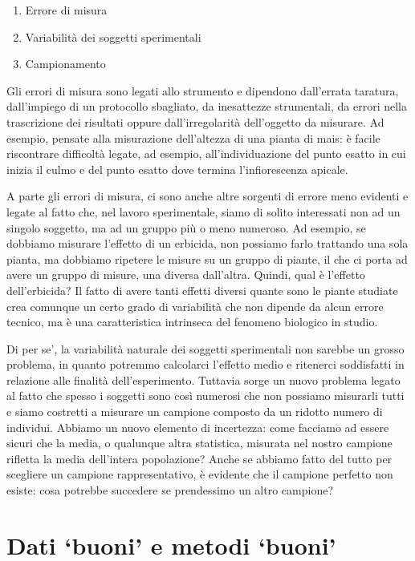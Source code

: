 \documentclass[a4paper,12pt,oneside]{book}
\providecommand{\tightlist}{%
  \setlength{\itemsep}{0pt}\setlength{\parskip}{0pt}}
\begin{document}
\begin{enumerate}
\def\labelenumi{\arabic{enumi}.}
\tightlist
\item
  Errore di misura
\item
  Variabilità dei soggetti sperimentali
\item
  Campionamento
\end{enumerate}

Gli errori di misura sono legati allo strumento e dipendono dall'errata taratura, dall'impiego di un protocollo sbagliato, da inesattezze strumentali, da errori nella trascrizione dei risultati oppure dall'irregolarità dell'oggetto da misurare. Ad esempio, pensate alla misurazione dell'altezza di una pianta di mais: è facile riscontrare difficoltà legate, ad esempio, all'individuazione del punto esatto in cui inizia il culmo e del punto esatto dove termina l'infiorescenza apicale.

A parte gli errori di misura, ci sono anche altre sorgenti di errore meno evidenti e legate al fatto che, nel lavoro sperimentale, siamo di solito interessati non ad un singolo soggetto, ma ad un gruppo più o meno numeroso. Ad esempio, se dobbiamo misurare l'effetto di un erbicida, non possiamo farlo trattando una sola pianta, ma dobbiamo ripetere le misure su un gruppo di piante, il che ci porta ad avere un gruppo di misure, una diversa dall'altra. Quindi, qual è l'effetto dell'erbicida? Il fatto di avere tanti effetti diversi quante sono le piante studiate crea comunque un certo grado di variabilità che non dipende da alcun errore tecnico, ma è una caratteristica intrinseca del fenomeno biologico in studio.

Di per se', la variabilità naturale dei soggetti sperimentali non sarebbe un grosso problema, in quanto potremmo calcolarci l'effetto medio e ritenerci soddisfatti in relazione alle finalità dell'esperimento. Tuttavia sorge un nuovo problema legato al fatto che spesso i soggetti sono così numerosi che non possiamo misurarli tutti e siamo costretti a misurare un campione composto da un ridotto numero di individui. Abbiamo un nuovo elemento di incertezza: come facciamo ad essere sicuri che la media, o qualunque altra statistica, misurata nel nostro campione rifletta la media dell'intera popolazione? Anche se abbiamo fatto del tutto per scegliere un campione rappresentativo, è evidente che il campione perfetto non esiste: cosa potrebbe succedere se prendessimo un altro campione?

\hypertarget{dati-buoni-e-metodi-buoni}{%
\section{Dati `buoni' e metodi `buoni'}\label{dati-buoni-e-metodi-buoni}}
\end{document}

